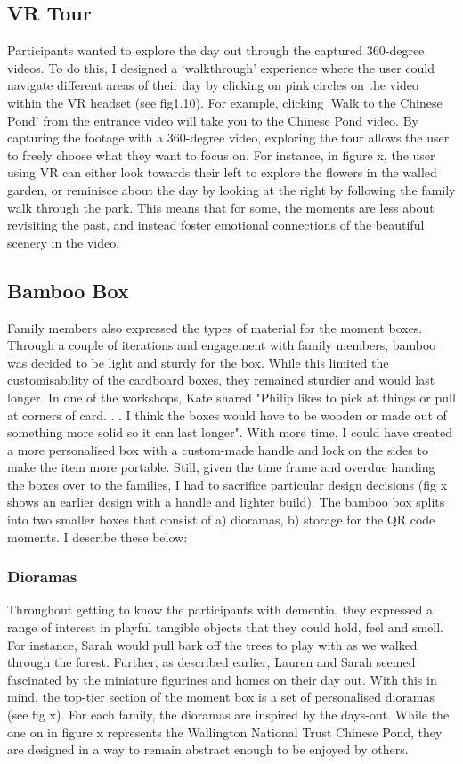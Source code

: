 \subsection{VR Tour}
\label{VRTour}
Participants wanted to explore the day out through the captured 360-degree videos. To do this, I designed a ‘walkthrough’ experience where the user could navigate different areas of their day by clicking on pink circles on the video within the VR headset (see fig1.10). For example, clicking ‘Walk to the Chinese Pond’ from the entrance video will take you to the Chinese Pond video. By capturing the footage with a 360-degree video, exploring the tour allows the user to freely choose what they want to focus on. For instance, in figure x, the user using VR can either look towards their left to explore the flowers in the walled garden, or reminisce about the day by looking at the right by following the family walk through the park. This means that for some, the moments are less about revisiting the past, and instead foster emotional connections of the beautiful scenery in the video. 

\subsection{Bamboo Box}
\label{Bamboo box}
Family members also expressed the types of material for the moment boxes. Through a couple of iterations and engagement with family members, bamboo was decided to be light and sturdy for the box. While this limited the customisability of the cardboard boxes, they remained sturdier and would last longer. In one of the workshops, Kate shared "Philip likes to pick at things or pull at corners of card. . . I think the boxes would have to be wooden or made out of something more solid so it can last longer". With more time, I could have created a more personalised box with a custom-made handle and lock on the sides to make the item more portable. Still, given the time frame and overdue handing the boxes over to the families, I had to sacrifice particular design decisions (fig x shows an earlier design with a handle and lighter build). The bamboo box splits into two smaller boxes that consist of a) dioramas, b) storage for the QR code moments. I describe these below:

\subsubsection{Dioramas}
\label{Dioramas}
Throughout getting to know the participants with dementia, they expressed a range of interest in playful tangible objects that they could hold, feel and smell. For instance, Sarah would pull bark off the trees to play with as we walked through the forest. Further, as described earlier, Lauren and Sarah seemed fascinated by the miniature figurines and homes on their day out. With this in mind, the top-tier section of the moment box is a set of personalised dioramas (see fig x). For each family, the dioramas are inspired by the days-out. While the one on in figure x represents the Wallington National Trust Chinese Pond, they are designed in a way to remain abstract enough to be enjoyed by others. 

